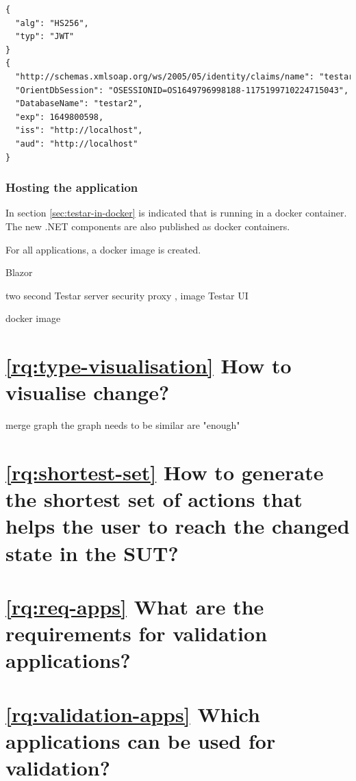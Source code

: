 \begin{lstlisting}[language=xml, caption=Decoded JWT header and Payload of the JWT given in listing \ref{code:jwt}, label=code:jwt-payload]
{
  "alg": "HS256",
  "typ": "JWT"
}
{
  "http://schemas.xmlsoap.org/ws/2005/05/identity/claims/name": "testar",
  "OrientDbSession": "OSESSIONID=OS1649796998188-1175199710224715043",
  "DatabaseName": "testar2",
  "exp": 1649800598,
  "iss": "http://localhost",
  "aud": "http://localhost"
}
\end{lstlisting}






\subsubsection{Hosting the application}
In section \ref{sec:testar-in-docker} is indicated that \testar is running in a docker container. The new .NET components are also published as docker containers. 


For all applications, a docker image is created. 





Blazor

two second
Testar server
security
proxy , 
image
Testar UI

docker image

\section{\ref{rq:type-visualisation} How to visualise change?}

merge graph \cite{andrews2009visual}
the graph needs to be similar are "enough"

\section{\ref{rq:shortest-set} How to generate the shortest set of actions that helps the user to reach the changed state in the SUT?}

\section{\ref{rq:req-apps} What are the requirements for validation applications?}

\section{\ref{rq:validation-apps} Which applications can be used for validation?}
